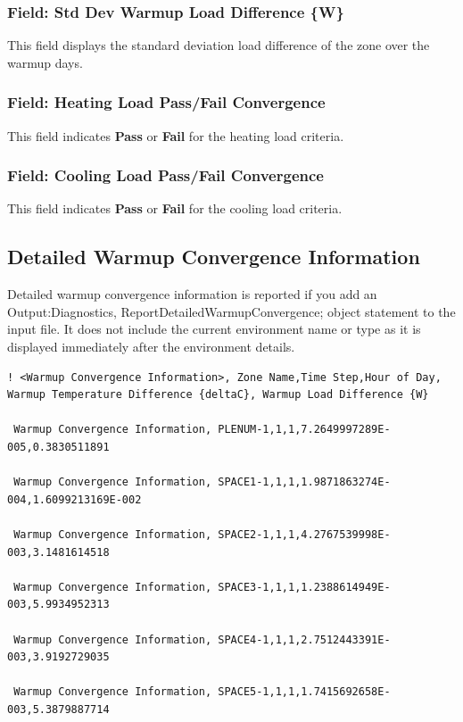 \subsubsection{Field: Std Dev Warmup Load Difference \{W\}}

This field displays the standard deviation load difference of the zone over the warmup days.

\subsubsection{Field: Heating Load Pass/Fail Convergence}

This field indicates \textbf{Pass} or \textbf{Fail} for the heating load criteria.

\subsubsection{Field: Cooling Load Pass/Fail Convergence}

This field indicates \textbf{Pass} or \textbf{Fail} for the cooling load criteria.

\subsection{Detailed Warmup Convergence Information}

Detailed warmup convergence information is reported if you add an Output:Diagnostics, ReportDetailedWarmupConvergence; object statement to the input file. It does not include the current environment name or type as it is displayed immediately after the environment details.

\begin{lstlisting}
! <Warmup Convergence Information>, Zone Name,Time Step,Hour of Day, Warmup Temperature Difference {deltaC}, Warmup Load Difference {W}

 Warmup Convergence Information, PLENUM-1,1,1,7.2649997289E-005,0.3830511891

 Warmup Convergence Information, SPACE1-1,1,1,1.9871863274E-004,1.6099213169E-002

 Warmup Convergence Information, SPACE2-1,1,1,4.2767539998E-003,3.1481614518

 Warmup Convergence Information, SPACE3-1,1,1,1.2388614949E-003,5.9934952313

 Warmup Convergence Information, SPACE4-1,1,1,2.7512443391E-003,3.9192729035

 Warmup Convergence Information, SPACE5-1,1,1,1.7415692658E-003,5.3879887714
\end{lstlisting}

